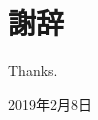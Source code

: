 \newpage
\thispagestyle{empty}

\chapter*{謝辞}

Thanks.

\begin{flushright}
  \vspace{15mm}
  2019年2月8日 \hspace{2cm}
\end{flushright}
